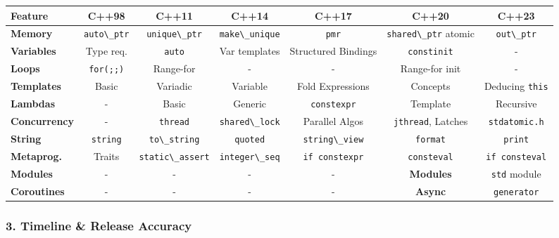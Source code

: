 \begin{longtable}[]{@{}lcccccc@{}}
\toprule
Feature & C++98 & C++11 & C++14 & C++17 & C++20 & C++23 \\
\midrule
\endhead
\textbf{Memory} & \passthrough{\lstinline!auto\_ptr!} &
\passthrough{\lstinline!unique\_ptr!} &
\passthrough{\lstinline!make\_unique!} & \passthrough{\lstinline!pmr!} &
\passthrough{\lstinline!shared\_ptr!} atomic &
\passthrough{\lstinline!out\_ptr!} \\
\textbf{Variables} & Type req. & \passthrough{\lstinline!auto!} & Var
templates & Structured Bindings & \passthrough{\lstinline!constinit!} &
- \\
\textbf{Loops} & \passthrough{\lstinline!for(;;)!} & Range-for & - & - &
Range-for init & - \\
\textbf{Templates} & Basic & Variadic & Variable & Fold Expressions &
Concepts & Deducing \passthrough{\lstinline!this!} \\
\textbf{Lambdas} & - & Basic & Generic &
\passthrough{\lstinline!constexpr!} & Template & Recursive \\
\textbf{Concurrency} & - & \passthrough{\lstinline!thread!} &
\passthrough{\lstinline!shared\_lock!} & Parallel Algos &
\passthrough{\lstinline!jthread!}, Latches &
\passthrough{\lstinline!stdatomic.h!} \\
\textbf{String} & \passthrough{\lstinline!string!} &
\passthrough{\lstinline!to\_string!} & \passthrough{\lstinline!quoted!}
& \passthrough{\lstinline!string\_view!} &
\passthrough{\lstinline!format!} & \passthrough{\lstinline!print!} \\
\textbf{Metaprog.} & Traits & \passthrough{\lstinline!static\_assert!} &
\passthrough{\lstinline!integer\_seq!} &
\passthrough{\lstinline!if constexpr!} &
\passthrough{\lstinline!consteval!} &
\passthrough{\lstinline!if consteval!} \\
\textbf{Modules} & - & - & - & - & \textbf{Modules} &
\passthrough{\lstinline!std!} module \\
\textbf{Coroutines} & - & - & - & - & \textbf{Async} &
\passthrough{\lstinline!generator!} \\
\bottomrule
\end{longtable}

\hypertarget{timeline-release-accuracy}{%
\subsubsection{3. Timeline \& Release
Accuracy}\label{timeline-release-accuracy}}

